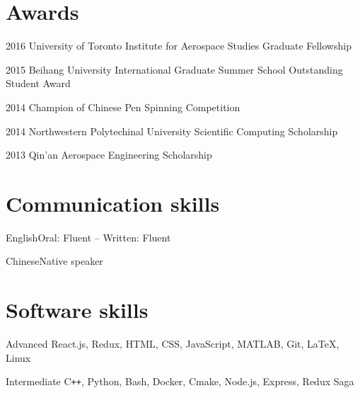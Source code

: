\documentclass{tccv}
\begin{document}
\section{Awards}

\begin{factlist}
  \item{2016}
  {University of Toronto Institute for Aerospace Studies Graduate Fellowship}

  \item{2015}
  {Beihang University International Graduate Summer School Outstanding Student Award}

  \item{2014}
  {Champion of Chinese Pen Spinning Competition}

  \item{2014}
  {Northwestern Polytechinal University Scientific Computing Scholarship}

  \item{2013}
  {Qin'an Aerospace Engineering Scholarship}

\end{factlist}

\section{Communication skills}
\begin{factlist}
  \item{English}{Oral: Fluent -- Written: Fluent}
  \item{Chinese}{Native speaker}
\end{factlist}

\section{Software skills}
\begin{factlist}
  \item{Advanced}
  {React.js, Redux, HTML, CSS, JavaScript, MATLAB, Git, \LaTeX, Linux}

  \item{Intermediate}
  {C\texttt{++}, Python, Bash, Docker, Cmake, Node.js, Express, Redux Saga}

\end{factlist}
\end{document}
